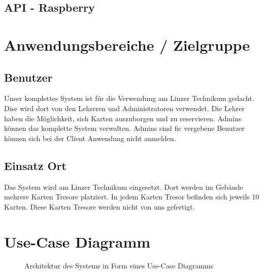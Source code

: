 \documentclass[a4paper]{article}
\begin{document}
\newpage
\subsection{API - Raspberry}

\newpage
\section{Anwendungsbereiche / Zielgruppe}
\subsection{Benutzer}
Unser komplettes System ist für die Verwendung am Linzer Technikum gedacht. Dise wird dort von den Lehreren und Administratoren verwendet. Die Lehrer haben die Möglichkeit, sich Karten auszuborgen und zu reservieren. Admins können das komplette System verwalten. Admins sind fic vergebene Benutzer können sich bei der Client Anwendung nicht anmelden.


\subsection{Einsatz Ort}
Das System wird am Linzer Technikum eingesetzt. Dort werden im Gebäude mehrere Karten Tresore platziert. In jedem Karten Tresor befinden sich jeweils 10 Karten. Diese Karten Tresore werden nicht von uns gefertigt.

\newpage
\section{Use-Case Diagramm}
\begin{figure}[htbp]
  \centering
   
  \caption{Architektur des Systems in Form eines Use-Case Diagramms}
  \label{architecture}
\end{figure}

\listoffigures
\end{document}
